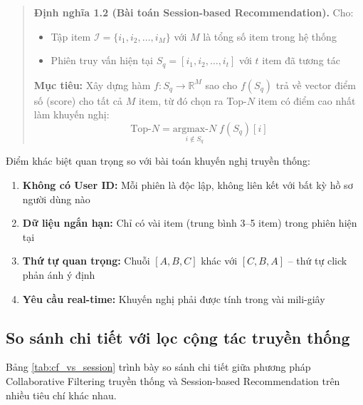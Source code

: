 \documentclass[12pt, a4paper]{article}
\begin{document}
\begin{quote}
\textbf{Định nghĩa 1.2 (Bài toán Session-based Recommendation).} Cho:
\begin{itemize}
    \item Tập item $\mathcal{I} = \{i_1, i_2, \ldots, i_M\}$ với $M$ là tổng số item trong hệ thống
    \item Phiên truy vấn hiện tại $S_q = [i_1, i_2, \ldots, i_t]$ với $t$ item đã tương tác
\end{itemize}
\textbf{Mục tiêu:} Xây dựng hàm $f: S_q \rightarrow \mathbb{R}^M$ sao cho $f(S_q)$ trả về vector điểm số (score) cho tất cả $M$ item, từ đó chọn ra Top-$N$ item có điểm cao nhất làm khuyến nghị:
\begin{equation}
    \text{Top-}N = \underset{i \notin S_q}{\text{argmax-}N} \; f(S_q)[i]
    \label{eq:topn}
\end{equation}
\end{quote}

Điểm khác biệt quan trọng so với bài toán khuyến nghị truyền thống:
\begin{enumerate}
    \item \textbf{Không có User ID:} Mỗi phiên là độc lập, không liên kết với bất kỳ hồ sơ người dùng nào
    \item \textbf{Dữ liệu ngắn hạn:} Chỉ có vài item (trung bình 3--5 item) trong phiên hiện tại
    \item \textbf{Thứ tự quan trọng:} Chuỗi $[A, B, C]$ khác với $[C, B, A]$ -- thứ tự click phản ánh ý định
    \item \textbf{Yêu cầu real-time:} Khuyến nghị phải được tính trong vài mili-giây
\end{enumerate}

\subsection{So sánh chi tiết với lọc cộng tác truyền thống}

Bảng \ref{tab:cf_vs_session} trình bày so sánh chi tiết giữa phương pháp Collaborative Filtering truyền thống và Session-based Recommendation trên nhiều tiêu chí khác nhau.
\end{document}
